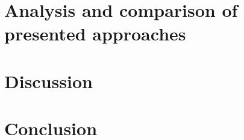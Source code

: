 \documentclass[runningheads]{llncs}
\begin{document}
\section{Analysis and comparison of presented approaches} \label{analysis}
\section{Discussion} \label{discussion}
\section{Conclusion} \label{conclusion}

%
%
%


%
\end{document}
